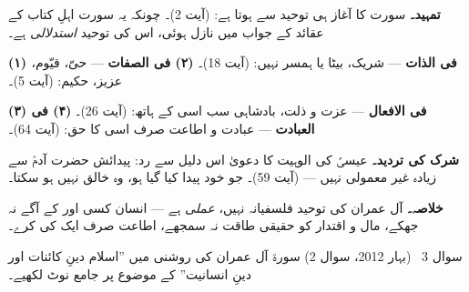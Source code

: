 \begin{hal}
\textbf{تمہید۔} سورت کا آغاز ہی توحید سے ہوتا ہے:  (آیت \textenglish{2})۔ چونکہ یہ سورت اہلِ کتاب کے
عقائد کے جواب میں نازل ہوئی، اس کی توحید \emph{استدلالی} ہے۔

\medskip
\textbf{(۱) فی الذات} --- شریک، بیٹا یا ہمسر نہیں:  (آیت \textenglish{18})۔ \quad
\textbf{(۲) فی الصفات} --- حیّ، قیّوم، عزیز، حکیم:  (آیت \textenglish{5})۔

\smallskip
\textbf{(۳) فی الافعال} --- عزت و ذلت، بادشاہی سب اسی کے ہاتھ:  (آیت
\textenglish{26})۔ \quad
\textbf{(۴) فی العبادت} --- عبادت و اطاعت صرف اسی کا حق:  (آیت \textenglish{64})۔

\medskip
\textbf{شرک کی تردید۔} عیسیٰؑ کی الوہیت کا دعویٰ اس دلیل سے رد: پیدائش حضرت
آدمؑ سے زیادہ غیر معمولی نہیں ---  (آیت \textenglish{59})۔ جو خود پیدا کیا
گیا ہو، وہ خالق نہیں ہو سکتا۔

\medskip
\textbf{خلاصہ۔} آل عمران کی توحید فلسفیانہ نہیں، \emph{عملی} ہے --- انسان کسی
اور کے آگے نہ جھکے، مال و اقتدار کو حقیقی طاقت نہ سمجھے، اطاعت صرف ایک کی کرے۔
\end{hal}

\begin{sawal}{سوال \textenglish{3} \ \textnormal{\small(بہار \textenglish{2012}، سوال \textenglish{2})}}
سورۃ آل عمران کی روشنی میں ''اسلام دینِ کائنات اور دینِ انسانیت'' کے موضوع پر
جامع نوٹ لکھیے۔
\end{sawal}

